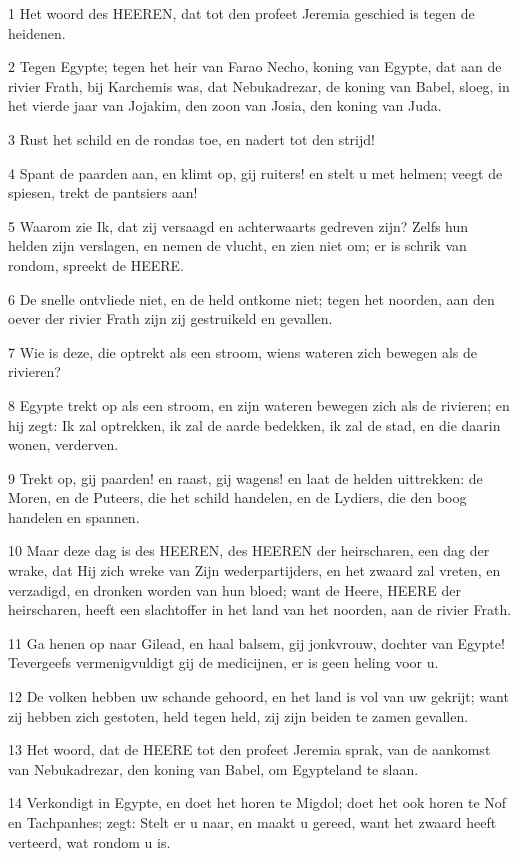 \par 1 Het woord des HEEREN, dat tot den profeet Jeremia geschied is tegen de heidenen.
\par 2 Tegen Egypte; tegen het heir van Farao Necho, koning van Egypte, dat aan de rivier Frath, bij Karchemis was, dat Nebukadrezar, de koning van Babel, sloeg, in het vierde jaar van Jojakim, den zoon van Josia, den koning van Juda.
\par 3 Rust het schild en de rondas toe, en nadert tot den strijd!
\par 4 Spant de paarden aan, en klimt op, gij ruiters! en stelt u met helmen; veegt de spiesen, trekt de pantsiers aan!
\par 5 Waarom zie Ik, dat zij versaagd en achterwaarts gedreven zijn? Zelfs hun helden zijn verslagen, en nemen de vlucht, en zien niet om; er is schrik van rondom, spreekt de HEERE.
\par 6 De snelle ontvliede niet, en de held ontkome niet; tegen het noorden, aan den oever der rivier Frath zijn zij gestruikeld en gevallen.
\par 7 Wie is deze, die optrekt als een stroom, wiens wateren zich bewegen als de rivieren?
\par 8 Egypte trekt op als een stroom, en zijn wateren bewegen zich als de rivieren; en hij zegt: Ik zal optrekken, ik zal de aarde bedekken, ik zal de stad, en die daarin wonen, verderven.
\par 9 Trekt op, gij paarden! en raast, gij wagens! en laat de helden uittrekken: de Moren, en de Puteers, die het schild handelen, en de Lydiers, die den boog handelen en spannen.
\par 10 Maar deze dag is des HEEREN, des HEEREN der heirscharen, een dag der wrake, dat Hij zich wreke van Zijn wederpartijders, en het zwaard zal vreten, en verzadigd, en dronken worden van hun bloed; want de Heere, HEERE der heirscharen, heeft een slachtoffer in het land van het noorden, aan de rivier Frath.
\par 11 Ga henen op naar Gilead, en haal balsem, gij jonkvrouw, dochter van Egypte! Tevergeefs vermenigvuldigt gij de medicijnen, er is geen heling voor u.
\par 12 De volken hebben uw schande gehoord, en het land is vol van uw gekrijt; want zij hebben zich gestoten, held tegen held, zij zijn beiden te zamen gevallen.
\par 13 Het woord, dat de HEERE tot den profeet Jeremia sprak, van de aankomst van Nebukadrezar, den koning van Babel, om Egypteland te slaan.
\par 14 Verkondigt in Egypte, en doet het horen te Migdol; doet het ook horen te Nof en Tachpanhes; zegt: Stelt er u naar, en maakt u gereed, want het zwaard heeft verteerd, wat rondom u is.
